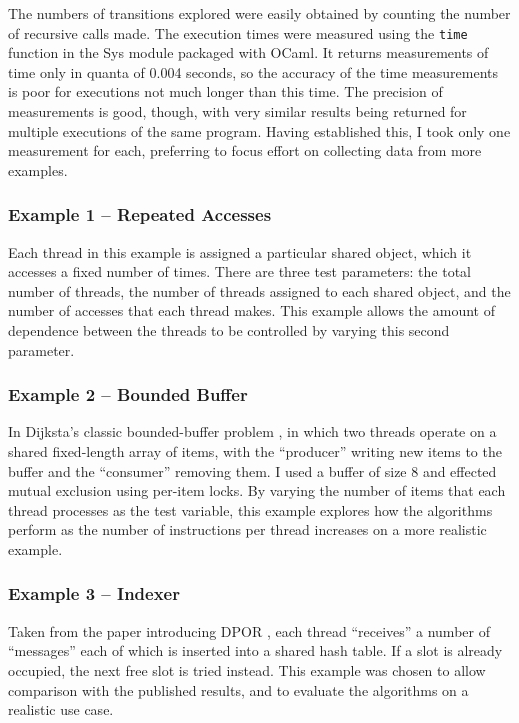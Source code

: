 \documentclass[12pt,a4paper,twoside,openright]{report}
\begin{document}
The numbers of transitions explored were easily
obtained by counting the number of recursive calls made.
The execution times were measured using the \texttt{time}
function in the Sys module packaged with OCaml. It returns
measurements of time only in quanta of 0.004 seconds,
so the accuracy of the time measurements is poor for
executions not much longer than this time.
The precision of measurements
is good, though, with very similar results being returned
for multiple executions of the same program.
Having established this,
I took only one measurement
for each, preferring
to focus effort on collecting data
from more examples.

\subsubsection{Example 1 -- Repeated Accesses}
Each thread in this example is assigned a particular
shared object, which it accesses a
fixed number of times. There are three test parameters:
the total number of threads, the number of threads
assigned to each shared object, and the
number of accesses that each thread
makes. This example allows
the amount of dependence between the threads
to be controlled by varying this second parameter.

\subsubsection{Example 2 -- Bounded Buffer}
In Dijksta's classic bounded-buffer problem
\cite{dijk74},
in which two threads operate on a shared fixed-length
array of items, with the ``producer''
writing new items to the buffer and the
``consumer'' removing them.
I used a buffer of size 8 and effected mutual
exclusion using per-item locks. By varying
the number of items that each thread processes
as the test variable, this example explores
how the algorithms perform as the number
of instructions per thread increases on a
more realistic example.

\subsubsection{Example 3 -- Indexer}
Taken from the paper introducing DPOR
\cite[Figure~1]{flan05}, each
thread ``receives'' a number of
``messages'' each of which is inserted
into a shared hash table. If a slot
is already occupied, the
next free slot is tried instead.
This example was chosen to allow
comparison with the published
results, and to evaluate the algorithms
on a realistic use case.
\end{document}
